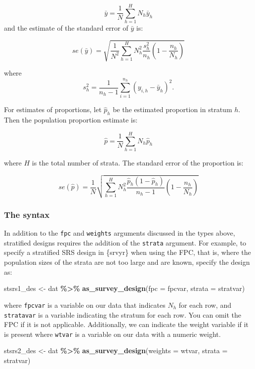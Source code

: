 \documentclass[
]{krantz}
\makeatletter
\newenvironment{Shaded}{\begin{snugshade}}{\end{snugshade}}
\newcommand{\AttributeTok}[1]{\textcolor[rgb]{0.27,0.27,0.27}{#1}}
\newcommand{\FunctionTok}[1]{\textcolor[rgb]{0.27,0.27,0.27}{\textbf{#1}}}
\newcommand{\NormalTok}[1]{#1}
\newcommand{\OtherTok}[1]{\textcolor[rgb]{0.37,0.37,0.37}{#1}}
\newcommand{\SpecialCharTok}[1]{\textcolor[rgb]{0.43,0.43,0.43}{\textbf{#1}}}
\newenvironment{kframe}{%
\medskip{}
\setlength{\fboxsep}{.8em}
 \def\at@end@of@kframe{}%
 \ifinner\ifhmode%
  \def\at@end@of@kframe{\end{minipage}}%
  \begin{minipage}{\columnwidth}%
 \fi\fi%
 \def\FrameCommand##1{\hskip\@totalleftmargin \hskip-\fboxsep
 \colorbox{shadecolor}{##1}\hskip-\fboxsep
     \hskip-\linewidth \hskip-\@totalleftmargin \hskip\columnwidth}%
 \MakeFramed {\advance\hsize-\width
   \@totalleftmargin\z@ \linewidth\hsize
   \@setminipage}}%
 {\par\unskip\endMakeFramed%
 \at@end@of@kframe}
\renewenvironment{Shaded}{\begin{kframe}}{\end{kframe}}
\makeatother
\begin{document}
\[\bar{y}=\frac{1}{N}\sum_{h=1}^H N_h\bar{y}_h\]
and the estimate of the standard error of \(\bar{y}\) is:

\[se(\bar{y})=\sqrt{\frac{1}{N^2} \sum_{h=1}^H N_h^2 \frac{s_h^2}{n_h}\left(1-\frac{n_h}{N_h}\right)} \]

where
\[s_h^2=\frac{1}{n_h-1}\sum_{i=1}^{n_h}\left(y_{i,h}-\bar{y}_h\right)^2.\]

For estimates of proportions, let \(\hat{p}_h\) be the estimated proportion in stratum \(h\). Then the population proportion estimate is:

\[\hat{p}= \frac{1}{N}\sum_{h=1}^H N_h \hat{p}_h\]

where \(H\) is the total number of strata. The standard error of the proportion is:

\[se(\hat{p}) = \frac{1}{N} \sqrt{ \sum_{h=1}^H N_h^2 \frac{\hat{p}_h(1-\hat{p}_h)}{n_h-1} \left(1-\frac{n_h}{N_h}\right)}\]

\hypertarget{the-syntax-2}{%
\subsubsection*{The syntax}\label{the-syntax-2}}


In addition to the \texttt{fpc} and \texttt{weights} arguments discussed in the types above, stratified designs requires the addition of the \texttt{strata} argument. For example, to specify a stratified SRS design in \{srvyr\} when using the FPC, that is, where the population sizes of the strata are not too large and are known, specify the design as:

\begin{Shaded}
\begin{Highlighting}[]
\NormalTok{stsrs1\_des }\OtherTok{\textless{}{-}}\NormalTok{ dat }\SpecialCharTok{\%\textgreater{}\%}
 \FunctionTok{as\_survey\_design}\NormalTok{(}\AttributeTok{fpc =}\NormalTok{ fpcvar, }
                  \AttributeTok{strata =}\NormalTok{ stratvar)}
\end{Highlighting}
\end{Shaded}

where \texttt{fpcvar} is a variable on our data that indicates \(N_h\) for each row, and \texttt{stratavar} is a variable indicating the stratum for each row. You can omit the FPC if it is not applicable. Additionally, we can indicate the weight variable if it is present where \texttt{wtvar} is a variable on our data with a numeric weight.

\begin{Shaded}
\begin{Highlighting}[]
\NormalTok{stsrs2\_des }\OtherTok{\textless{}{-}}\NormalTok{ dat }\SpecialCharTok{\%\textgreater{}\%}
 \FunctionTok{as\_survey\_design}\NormalTok{(}\AttributeTok{weights =}\NormalTok{ wtvar, }
                  \AttributeTok{strata =}\NormalTok{ stratvar)}
\end{Highlighting}
\end{Shaded}
\end{document}
